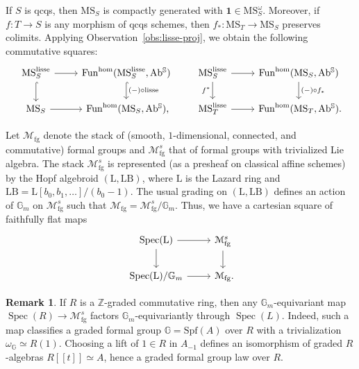 \documentclass{amsart}
\numberwithin{equation}{section}
\theoremstyle{plain}
\theoremstyle{definition}
\newtheorem{remark}[equation]{Remark}
\let\scr=\mathcal
\let\bb=\mathbb
\def\Z{\bb Z}
\def\1{\mathbf 1}
\def\G{\mathbb G}
\def\ph{\mathord-}
\def\L{\mathrm{L}{}}
\def\LB{\mathrm{LB}{}}
\DeclareMathOperator{\Spec}{Spec}
\def\MS{\mathrm{MS}}
\def\Ab{\mathrm{A}\mathrm{b}}
\def\Fun{\mathrm{Fun}}
\def\fg{\mathrm{fg}}
\def\lisse{\mathrm{lisse}}
\begin{document}
If $S$ is qcqs, then $\MS_S$ is compactly generated with $\1\in\MS_S^\omega$. Moreover, if $f\colon T\to S$ is any morphism of qcqs schemes, then $f_*\colon \MS_T\to\MS_S$ preserves colimits. Applying Observation~\ref{obs:lisse-proj}, we obtain the following commutative squares:
\begin{equation}
\label{eqn:LEFT-lisse}
\begin{tikzcd}[ampersand replacement=\&]
	\MS_S^\lisse \ar{r} \ar[hook]{d} \& \Fun^\mathrm{hom}(\MS_S^\lisse,\Ab^\bb S) \ar[hook]{d}{(\ph)\circ \lisse} \\
	\MS_S \ar{r} \& \Fun^\mathrm{hom}(\MS_S,\Ab^\bb S)\rlap,
\end{tikzcd}
\qquad
\begin{tikzcd}[ampersand replacement=\&]
	\MS_S^\lisse \ar{r} \ar{d}[swap]{f^*} \& \Fun^\mathrm{hom}(\MS_S,\Ab^\bb S) \ar{d}{(\ph)\circ f_*} \\
	\MS_T^\lisse \ar{r} \& \Fun^\mathrm{hom}(\MS_T,\Ab^\bb S)\rlap.
\end{tikzcd}
\end{equation}

Let $\scr M_\mathrm{fg}$ denote the stack of (smooth, $1$-dimensional, connected, and commutative) formal groups and $\scr M_\mathrm{fg}^s$ that of formal groups with trivialized Lie algebra. The stack $\scr M_\fg^s$ is represented (as a presheaf on classical affine schemes) by the Hopf algebroid $(\L,\LB)$, where $\L$ is the Lazard ring and $\LB=\L[b_0,b_1,\dotsc]/(b_0-1)$. The usual grading on $(\L,\LB)$ defines an action of $\G_m$ on $\scr M_\mathrm{fg}^s$ such that $\scr M_\mathrm{fg}=\scr M_\mathrm{fg}^s/\G_m$. Thus, we have a cartesian square of faithfully flat maps
\begin{equation}\label{eqn:Mfg}
\begin{tikzcd}
	\Spec(\L) \ar{r} \ar{d} & \scr M_\mathrm{fg}^s \ar{d} \\
	\Spec(\L)/\G_m \ar{r} & \scr M_\mathrm{fg}\rlap.
\end{tikzcd}
\end{equation}

\begin{remark}\label{rmk:equivariant-FGL}
	If $R$ is a $\Z$-graded commutative ring, then any $\G_m$-equivariant map $\Spec(R)\to\scr M_\fg^s$ factors $\G_m$-equivariantly through $\Spec(L)$.
	Indeed, such a map classifies a graded formal group $\G=\mathrm{Spf}(A)$ over $R$ with a trivialization $\omega_{\G}\simeq R(1)$. Choosing a lift of $1\in R$ in $A_{-1}$ defines an isomorphism of graded $R$-algebras $R[[t]]\simeq A$, hence a graded formal group law over $R$.
\end{remark}
\end{document}

